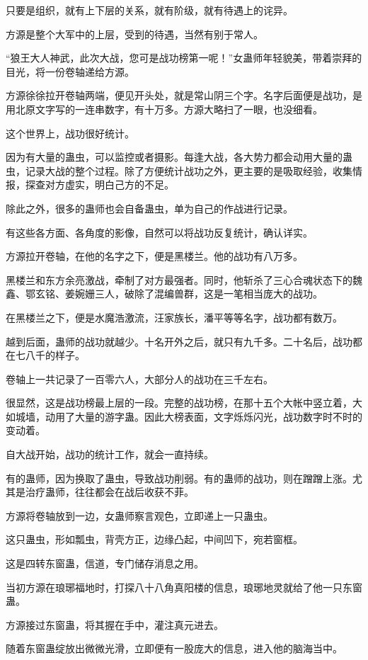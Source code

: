 \begin{this_body}
只要是组织，就有上下层的关系，就有阶级，就有待遇上的诧异。

方源是整个大军中的上层，受到的待遇，当然有别于常人。

“狼王大人神武，此次大战，您可是战功榜第一呢！”女蛊师年轻貌美，带着崇拜的目光，将一份卷轴递给方源。

方源徐徐拉开卷轴两端，便见开头处，就是常山阴三个字。名字后面便是战功，是用北原文字写的一连串数字，有十万多。方源大略扫了一眼，也没细看。

这个世界上，战功很好统计。

因为有大量的蛊虫，可以监控或者摄影。每逢大战，各大势力都会动用大量的蛊虫，记录大战的整个过程。除了方便统计战功之外，更主要的是吸取经验，收集情报，探查对方虚实，明白己方的不足。

除此之外，很多的蛊师也会自备蛊虫，单为自己的作战进行记录。

有这些各方面、各角度的影像，自然可以将战功反复统计，确认详实。

方源拉开卷轴，在他的名字之下，便是黑楼兰。他的战功有八万多。

黑楼兰和东方余亮激战，牵制了对方最强者。同时，他斩杀了三心合魂状态下的魏鑫、鄂玄铭、姜婉姗三人，破除了混编兽群，这是一笔相当庞大的战功。

在黑楼兰之下，便是水魔浩激流，汪家族长，潘平等等名字，战功都有数万。

越到后面，蛊师的战功就越少。十名开外之后，就只有九千多。二十名后，战功都在七八千的样子。

卷轴上一共记录了一百零六人，大部分人的战功在三千左右。

很显然，这是战功榜最上层的一段。完整的战功榜，在那十五个大帐中竖立着，大如城墙，动用了大量的游字蛊。因此大榜表面，文字烁烁闪光，战功数字时不时的变动着。

自大战开始，战功的统计工作，就会一直持续。

有的蛊师，因为换取了蛊虫，导致战功削弱。有的蛊师的战功，则在蹭蹭上涨。尤其是治疗蛊师，往往都会在战后收获不菲。

方源将卷轴放到一边，女蛊师察言观色，立即递上一只蛊虫。

这只蛊虫，形如瓢虫，背壳方正，边缘凸起，中间凹下，宛若窗框。

这是四转东窗蛊，信道，专门储存消息之用。

当初方源在琅琊福地时，打探八十八角真阳楼的信息，琅琊地灵就给了他一只东窗蛊。

方源接过东窗蛊，将其握在手中，灌注真元进去。

随着东窗蛊绽放出微微光滑，立即便有一股庞大的信息，进入他的脑海当中。


\end{this_body}
